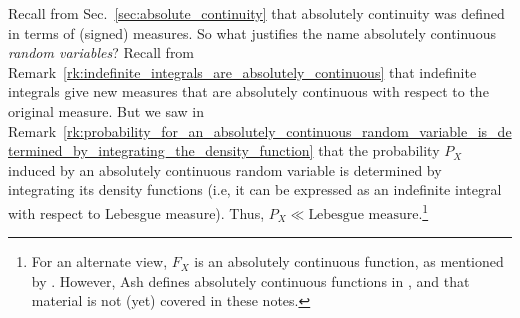 \documentclass{article} %
\begin{document}
\begin{remark}
Recall from Sec.~\ref{sec:absolute_continuity} that absolutely continuity was defined in terms of (signed) measures.  So what justifies the name absolutely continuous \textit{random variables}?  Recall from Remark~\ref{rk:indefinite_integrals_are_absolutely_continuous} that indefinite integrals give new measures that are absolutely continuous with respect to the original measure.  But we saw in Remark~\ref{rk:probability_for_an_absolutely_continuous_random_variable_is_determined_by_integrating_the_density_function} that the probability $P_X$ induced by an absolutely continuous random variable is determined by integrating its density functions (i.e, it can be expressed as an indefinite integral with respect to Lebesgue measure).   Thus, $P_X \ll \text{Lebesgue measure}$.\footnote{For an alternate view, $F_X$ is an absolutely continuous function, as mentioned by \cite[p.175]{ash2000probability}. However, Ash defines absolutely continuous functions in \cite[Sec.~2.3]{ash2000probability}, and that material is not (yet) covered in these notes.}
\end{remark}

\end{document}
